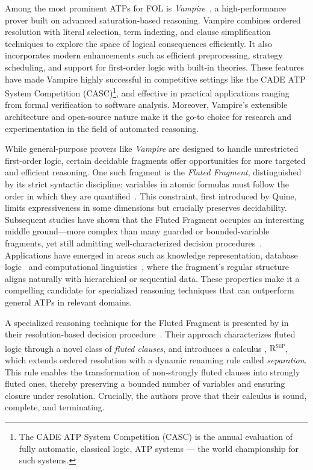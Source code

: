 Among the most prominent ATPs for FOL is \emph{Vampire}~\cite{kovacs2013vampire}, a high-performance prover built on advanced saturation-based reasoning.
Vampire combines ordered resolution with literal selection, term indexing, and clause simplification techniques to explore the space of logical consequences efficiently.
It also incorporates modern enhancements such as efficient preprocessing, strategy scheduling, and support for first-order logic with built-in theories.
These features have made Vampire highly successful in competitive settings like the CADE ATP System Competition (CASC)\footnote{The CADE ATP System Competition (CASC) is the annual evaluation of fully automatic, classical logic, ATP systems --- the world championship for such systems.}, and effective in practical applications ranging from formal verification to software analysis.
Moreover, Vampire's extensible architecture and open-source nature make it the go-to choice for research and experimentation in the field of automated reasoning.

While general-purpose provers like \emph{Vampire} are designed to handle unrestricted first-order logic, certain decidable fragments offer opportunities for more targeted and efficient reasoning.
One such fragment is the \emph{Fluted Fragment}, distinguished by its strict syntactic discipline: variables in atomic formulas must follow the order in which they are quantified~\cite{quine1968predicate}.
This constraint, first introduced by Quine, limits expressiveness in some dimensions but crucially preserves decidability. Subsequent studies have shown that the Fluted Fragment occupies an interesting middle ground—more complex than many guarded or bounded-variable fragments, yet still admitting well-characterized decision procedures~\cite{pratt2019fluted}.
Applications have emerged in areas such as knowledge representation, database logic~\cite{pratt-hartmann2023transitivity} and computational linguistics~\cite{quine1968predicate}, where the fragment’s regular structure aligns naturally with hierarchical or sequential data.
These properties make it a compelling candidate for specialized reasoning techniques that can outperform general ATPs in relevant domains.

A specialized reasoning technique for the Fluted Fragment is presented by \citeauthor{schmidt2000resolution} in their resolution-based decision procedure~\cite{schmidt2000resolution}.
Their approach characterizes fluted logic through a novel class of \emph{fluted clauses}, and introduces a calculus , \textsc{R\textsuperscript{sep}},  which extends ordered resolution with a dynamic renaming rule called \emph{separation}.
This rule enables the transformation of non-strongly fluted clauses into strongly fluted ones, thereby preserving a bounded number of variables and ensuring closure under resolution.
Crucially, the authors prove that their calculus is sound, complete, and terminating.

